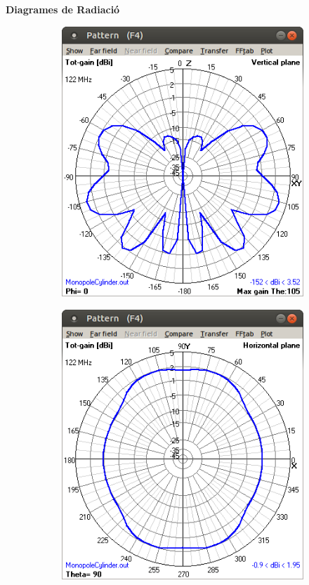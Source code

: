   \textbf{Diagrames de Radiació}

	\begin{figure}[H]
	\centering
	  \begin{subfigure}[b]{0.32\textwidth}
	  \includegraphics[width=\textwidth]{./images/5.Monopole_cylinder/vertical.png}
	  \caption{}
	  \label{1diag1}
	  \end{subfigure}
	  \qquad %
	  \begin{subfigure}[b]{0.32\textwidth}
	  \includegraphics[width=\textwidth]{./images/5.Monopole_cylinder/horizontal.png}

\end{subfigure}
\end{figure}
